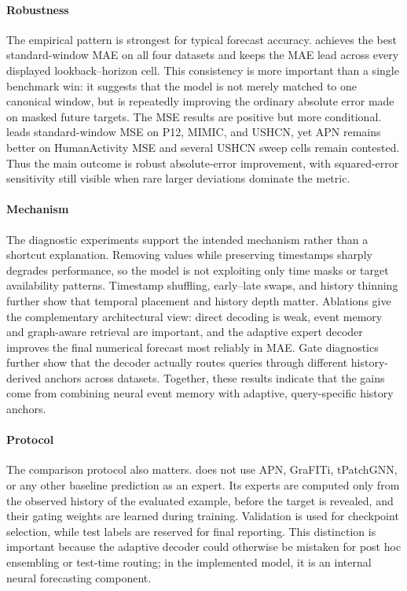 \documentclass[preprint,12pt]{elsarticle}
\begin{document}
\paragraph{Robustness}
The empirical pattern is strongest for typical forecast accuracy. \method{}
achieves the best standard-window MAE on all four datasets and keeps the MAE
lead across every displayed lookback--horizon cell. This consistency is more
important than a single benchmark win: it suggests that the model is not merely
matched to one canonical window, but is repeatedly improving the ordinary
absolute error made on masked future targets. The MSE results are positive but
more conditional. \method{} leads standard-window MSE on P12, MIMIC, and
USHCN, yet APN remains better on HumanActivity MSE and several USHCN sweep
cells remain contested. Thus the main outcome is robust absolute-error
improvement, with squared-error sensitivity still visible when rare larger
deviations dominate the metric.

\paragraph{Mechanism}
The diagnostic experiments support the intended mechanism rather than a
shortcut explanation. Removing values while preserving timestamps sharply
degrades performance, so the model is not exploiting only time masks or target
availability patterns. Timestamp shuffling, early--late swaps, and history
thinning further show that temporal placement and history depth matter.
Ablations give the complementary architectural view: direct decoding is weak,
event memory and graph-aware retrieval are important, and the adaptive expert
decoder improves the final numerical forecast most reliably in MAE. Gate
diagnostics further show that the decoder actually routes queries through
different history-derived anchors across datasets. Together, these results
indicate that the gains come from combining neural event memory with adaptive,
query-specific history anchors.

\paragraph{Protocol}
The comparison protocol also matters. \method{} does not use APN, GraFITi,
tPatchGNN, or any other baseline prediction as an expert. Its experts are
computed only from the observed history of the evaluated example, before the
target is revealed, and their gating weights are learned during training.
Validation is used for checkpoint selection, while test labels are reserved for
final reporting. This distinction is important because the adaptive decoder
could otherwise be mistaken for post hoc ensembling or test-time routing; in the
implemented model, it is an internal neural forecasting component.
\end{document}
